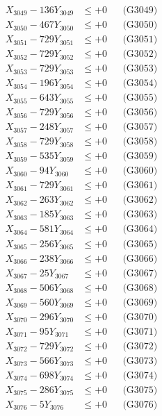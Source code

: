 \documentclass[a4paper,10pt]{article}
\begin{document}
{\begin{align}
X_{3049} - 136Y_{3049} &\leq +0 && \text{(G3049)} \\
X_{3050} - 467Y_{3050} &\leq +0 && \text{(G3050)} \\
\allowbreak
X_{3051} - 729Y_{3051} &\leq +0 && \text{(G3051)} \\
X_{3052} - 729Y_{3052} &\leq +0 && \text{(G3052)} \\
X_{3053} - 729Y_{3053} &\leq +0 && \text{(G3053)} \\
X_{3054} - 196Y_{3054} &\leq +0 && \text{(G3054)} \\
X_{3055} - 643Y_{3055} &\leq +0 && \text{(G3055)} \\
X_{3056} - 729Y_{3056} &\leq +0 && \text{(G3056)} \\
X_{3057} - 248Y_{3057} &\leq +0 && \text{(G3057)} \\
X_{3058} - 729Y_{3058} &\leq +0 && \text{(G3058)} \\
X_{3059} - 535Y_{3059} &\leq +0 && \text{(G3059)} \\
X_{3060} - 94Y_{3060} &\leq +0 && \text{(G3060)} \\
\allowbreak
X_{3061} - 729Y_{3061} &\leq +0 && \text{(G3061)} \\
X_{3062} - 263Y_{3062} &\leq +0 && \text{(G3062)} \\
X_{3063} - 185Y_{3063} &\leq +0 && \text{(G3063)} \\
X_{3064} - 581Y_{3064} &\leq +0 && \text{(G3064)} \\
X_{3065} - 256Y_{3065} &\leq +0 && \text{(G3065)} \\
X_{3066} - 238Y_{3066} &\leq +0 && \text{(G3066)} \\
X_{3067} - 25Y_{3067} &\leq +0 && \text{(G3067)} \\
X_{3068} - 506Y_{3068} &\leq +0 && \text{(G3068)} \\
X_{3069} - 560Y_{3069} &\leq +0 && \text{(G3069)} \\
X_{3070} - 296Y_{3070} &\leq +0 && \text{(G3070)} \\
\allowbreak
X_{3071} - 95Y_{3071} &\leq +0 && \text{(G3071)} \\
X_{3072} - 729Y_{3072} &\leq +0 && \text{(G3072)} \\
X_{3073} - 566Y_{3073} &\leq +0 && \text{(G3073)} \\
X_{3074} - 698Y_{3074} &\leq +0 && \text{(G3074)} \\
X_{3075} - 286Y_{3075} &\leq +0 && \text{(G3075)} \\
X_{3076} - 5Y_{3076} &\leq +0 && \text{(G3076)} \\

\end{align}}
\end{document}
